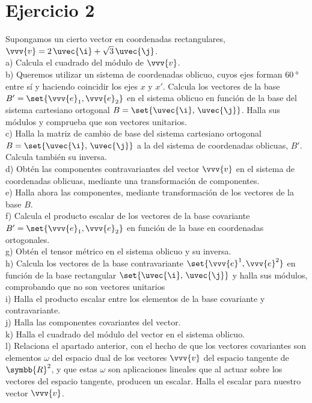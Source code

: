 %

\section{Ejercicio 2}
Supongamos un cierto vector en coordenadas rectangulares,
$\vvv{v} = 2\,\uvec{\i} + \sqrt{3}\,\uvec{\j}$.\\
a) Calcula el cuadrado del módulo de $\vvv{v}$.\\
b) Queremos utilizar un sistema de coordenadas oblicuo, cuyos ejes forman
$\qty{60}{\degree}$ entre sí y haciendo coincidir los ejes $x$ y $x'$.
Calcula los vectores de la base $B'=\set{\vvv{e}_1, \vvv{e}_2}$ en el sistema oblicuo
en función de la base del sistema cartesiano ortogonal $B=\set{\uvec{\i},\,\uvec{\j}}$.
Halla sus módulos y comprueba que son vectores unitarios.\\
c) Halla la matriz de cambio de base del sistema cartesiano ortogonal
$B=\set{\uvec{\i},\,\uvec{\j}}$ a la del sistema de coordenadas oblicuas, $B'$.
Calcula también su inversa.\\
d) Obtén las componentes contravariantes del vector $\vvv{v}$ en el sistema de
coordenadas oblicuas, mediante una transformación de componentes.\\
e) Halla ahora las componentes, mediante transformación de los vectores de la base $B$.\\
f) Calcula el producto escalar de los vectores de la base covariante
$B'=\set{\vvv{e}_1, \vvv{e}_2}$ en función de la base en coordenadas ortogonales.\\
g) Obtén el tensor métrico en el sistema oblicuo y su inversa.\\
h) Calcula los vectores de la base contravariante $\set{\vvv{e}^1,\vvv{e}^2}$ en función
de la base rectangular $\set{\uvec{\i},\,\uvec{\j}}$ y halla sus módulos, comprobando
que no son vectores unitarios\\
i) Halla el producto escalar entre los elementos de la base covariante y contravariante.\\
j) Halla las componentes covariantes del vector.\\
k) Halla el cuadrado del módulo del vector en el sistema oblicuo.\\
l) Relaciona el apartado anterior, con el hecho de que los vectores covariantes son
elementos $\omega$ del espacio dual de los vectores $\vvv{v}$ del espacio tangente de $\symbb{R}^2$, y que estas $\omega$ son aplicaciones lineales que al actuar sobre los
vectores del espacio tangente, producen un escalar. Halla el escalar para nuestro vector
$\vvv{v}$.\\

